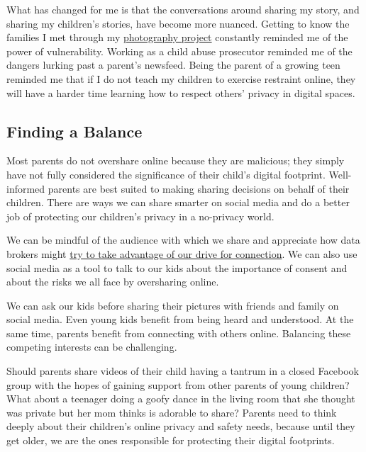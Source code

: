 What has changed for me is that the conversations around sharing my
story, and sharing my children's stories, have become more nuanced.
Getting to know the families I met through my
\href{https://www.washingtonpost.com/news/parenting/wp/2016/09/20/families-of-children-with-cancer-ask-please-dont-look-away-heres-how-you-can-help/}{photog­raphy
project} constantly reminded me of the power of vulnerability. Working
as a child abuse prosecutor reminded me of the dangers lurking past a
parent's newsfeed. Being the parent of a grow­ing teen reminded me that
if I do not teach my children to exer­cise restraint online, they will
have a harder time learning how to respect others' privacy in digital
spaces.

\hypertarget{finding-a-balance}{%
\subsection{Finding a Balance}\label{finding-a-balance}}

Most parents do not overshare online because they are malicious; they
simply have not fully considered the significance of their child's
digital footprint. Well-informed parents are best suited to making
sharing decisions on behalf of their children. There are ways we can
share smarter on social media and do a better job of protecting our
children's privacy in a no-privacy world.

We can be mindful of the audience with which we share and appreciate how
data brokers might
\href{https://journals.sagepub.com/doi/pdf/10.1177/0743915619858290?casa_token=jLmLV-iBYhkAAAAA\%3Aj7WZWr2WWuc5BbRn262FPWcMtc5qdErO-fTpqp97T7c59Fpnx6AmrdeQZACuMAv-Eh9MgreG8uBUXQ\&}{try
to take advantage of our drive for connection}. We can also use social
media as a tool to talk to our kids about the importance of consent and
about the risks we all face by oversharing online.

We can ask our kids before sharing their pictures with friends and
family on social media. Even young kids benefit from being heard and
understood. At the same time, parents benefit from connecting with
others online. Balancing these competing interests can be challenging.

Should parents share videos of their child having a tantrum in a closed
Facebook group with the hopes of gaining support from other parents of
young children? What about a teenager doing a goofy dance in the living
room that she thought was private but her mom thinks is adorable to
share? Parents need to think deeply about their children's online
privacy and safety needs, because until they get older, we are the ones
responsible for protecting their digital footprints.

